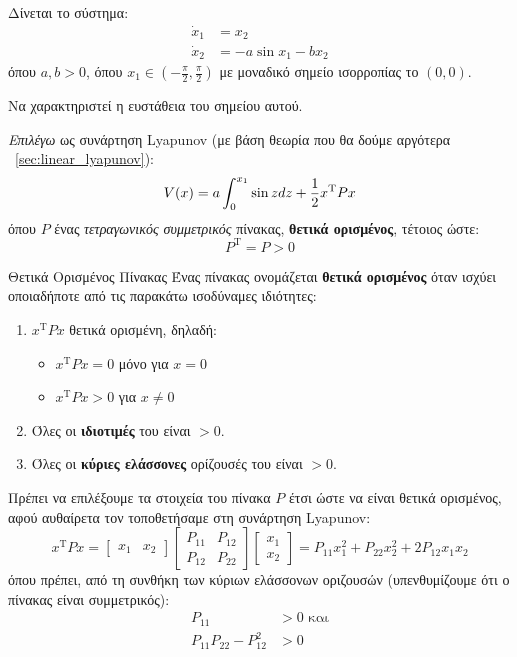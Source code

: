 \documentclass[11pt,a4paper,notitlepage,fleqn]{article}
\begin{document}
\begin{exercise}
	Δίνεται το σύστημα:
	\begin{align}
		\dot x_1 &= x_2 \label{sec1ex2m1} \\
		\dot x_2 &= -a\sin  x_1 - bx_2 \label{sec1ex2m2}
	\end{align}
	όπου \( a,b > 0 \), όπου \( x_1 \in \left(-\frac{π}{2},\frac{π}{2}\right) \) με μοναδικό σημείο ισορροπίας το \( (0,0) \).
	
	Να χαρακτηριστεί η ευστάθεια του σημείου αυτού.
	
	\tcblower
	
	\textit{Επιλέγω} ως συνάρτηση Lyapunov (με βάση θεωρία που θα δούμε αργότερα \textemdash~\autoref{sec:linear_lyapunov}):
	\[
	V(x) = a\int_{0}^{x_1} \sin z d z + \frac{1}{2} x^{\mathrm T} Px
	\]
	όπου \( P \) ένας \textit{τετραγωνικός συμμετρικός} πίνακας, \textbf{θετικά
	ορισμένος}, τέτοιος ώστε:
	\[
	P^{\mathrm T} = P > 0
	\]
	\begin{infobox}{Θετικά Ορισμένος Πίνακας}
		Ένας πίνακας ονομάζεται \textbf{θετικά ορισμένος} όταν ισχύει οποιαδήποτε
		από τις παρακάτω ισοδύναμες ιδιότητες:
		\begin{enumerate}
			\item \( x^{\mathrm T} P x \) θετικά ορισμένη, δηλαδή: \begin{itemize}
				\item \( x^{\mathrm T} P x = 0 \) μόνο για \( x = 0 \)
				\item \( x^{\mathrm T} P x > 0 \) για \( x \neq 0 \)
			\end{itemize}
			\item Όλες οι \textbf{ιδιοτιμές} του είναι \( >0 \).
			\item Όλες οι \textbf{κύριες ελάσσονες} ορίζουσές του είναι \( >0 \).
		\end{enumerate}
	\end{infobox}
	
	Πρέπει να επιλέξουμε τα στοιχεία του πίνακα \( P \) έτσι ώστε να είναι θετικά
	ορισμένος, αφού αυθαίρετα τον τοποθετήσαμε στη συνάρτηση Lyapunov:
	\[
	x^{\mathrm T} P x = \left[\begin{matrix}
	x_1 & x_2
	\end{matrix}\right]\left[
	\begin{matrix}
	P_{11} & P_{12} \\ P_{12} & P_{22}
	\end{matrix}
	\right] \left[
	\begin{matrix}
	x_1 \\ x_2
	\end{matrix}
	\right]= P_{11} x_1^2 + P_{22}x_2^2 + 2P_{12}x_1x_2
	\]
	όπου πρέπει, από τη συνθήκη των κύριων ελάσσονων οριζουσών (υπενθυμίζουμε ότι ο πίνακας είναι συμμετρικός):
	\begin{align*}
		P_{11} &> 0 \text{ και} \\ P_{11}P_{22} - P_{12}^2 &> 0
	\end{align*}
	

\end{exercise}
\end{document}
